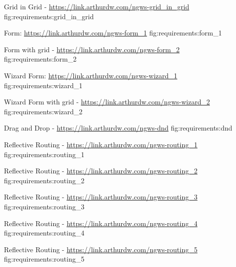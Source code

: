 {Grid in Grid - \url{https://link.arthurdw.com/ngws-grid_in_grid}}
{fig:requirements:grid_in_grid}

{Form: \url{https://link.arthurdw.com/ngws-form_1}}
{fig:requirements:form_1}

{Form with grid - \url{https://link.arthurdw.com/ngws-form_2}}
{fig:requirements:form_2}

{Wizard Form: \url{https://link.arthurdw.com/ngws-wizard_1}}
{fig:requirements:wizard_1}

{Wizard Form with grid - \url{https://link.arthurdw.com/ngws-wizard_2}}
{fig:requirements:wizard_2}

{Drag and Drop - \url{https://link.arthurdw.com/ngws-dnd}}
{fig:requirements:dnd}

{Reflective Routing - \url{https://link.arthurdw.com/ngws-routing_1}}
{fig:requirements:routing_1}

{Reflective Routing - \url{https://link.arthurdw.com/ngws-routing_2}}
{fig:requirements:routing_2}

{Reflective Routing - \url{https://link.arthurdw.com/ngws-routing_3}}
{fig:requirements:routing_3}

{Reflective Routing - \url{https://link.arthurdw.com/ngws-routing_4}}
{fig:requirements:routing_4}

{Reflective Routing - \url{https://link.arthurdw.com/ngws-routing_5}}
{fig:requirements:routing_5}

